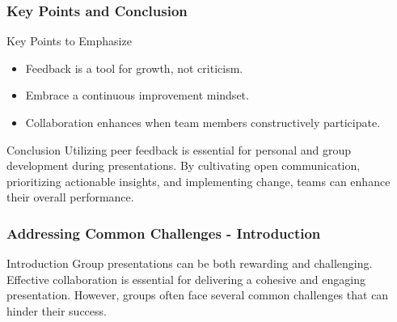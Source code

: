 \documentclass[aspectratio=169]{beamer}
\begin{document}
\begin{frame}[fragile]
    \frametitle{Key Points and Conclusion}
    \begin{block}{Key Points to Emphasize}
        \begin{itemize}
            \item Feedback is a tool for growth, not criticism.
            \item Embrace a continuous improvement mindset.
            \item Collaboration enhances when team members constructively participate.
        \end{itemize}
    \end{block}
    \begin{block}{Conclusion}
        Utilizing peer feedback is essential for personal and group development during presentations. By cultivating open communication, prioritizing actionable insights, and implementing change, teams can enhance their overall performance.
    \end{block}
\end{frame}

\begin{frame}[fragile]
    \frametitle{Addressing Common Challenges - Introduction}
    \begin{block}{Introduction}
        Group presentations can be both rewarding and challenging. Effective collaboration is essential for delivering a cohesive and engaging presentation. However, groups often face several common challenges that can hinder their success.
    \end{block}
\end{frame}
\end{document}
